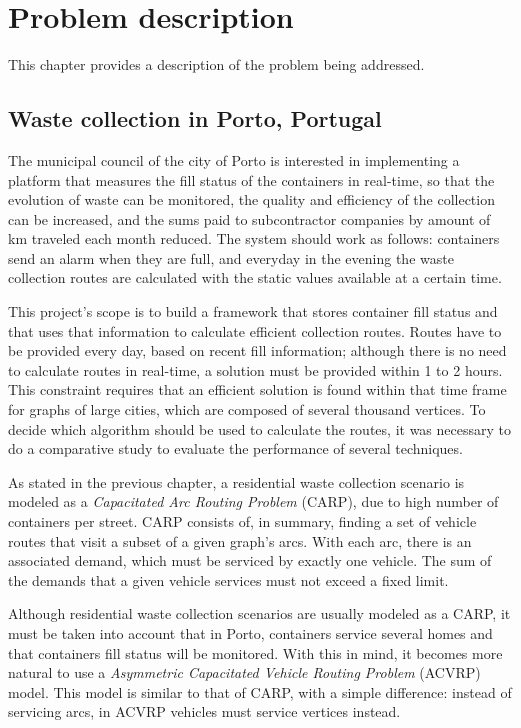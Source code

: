 \chapter{Problem description}
\label{chap:problem}

This chapter provides a description of the problem being addressed.


\section{Waste collection in Porto, Portugal}
\label{section:wcpp}

The municipal council of the city of Porto is interested in implementing a
platform that measures the fill status of the containers in real-time, so that
the evolution of waste can be monitored, the quality and efficiency of the
collection can be increased, and the sums paid to subcontractor companies by
amount of km traveled each month reduced. The system should work as follows:
containers send an alarm when they are full, and everyday in the evening the
waste collection routes are calculated with the static values available at a
certain time.

This project's scope is to build a framework that stores container fill status
and that uses that information to calculate efficient collection routes. Routes
have to be provided every day, based on recent fill information; although there
is no need to calculate routes in real-time, a solution must be provided within
1 to 2 hours. This constraint requires that an efficient solution is found
within that time frame for graphs of large cities, which are composed of
several thousand vertices. To decide which algorithm should be used to
calculate the routes, it was necessary to do a comparative study to evaluate
the performance of several techniques.

As stated in the previous chapter, a residential waste collection scenario is
modeled as a \textit{Capacitated Arc Routing Problem} (CARP), due to high number
of containers per street. CARP consists of, in summary, finding a set of vehicle
routes that visit a subset of a given graph's arcs. With each arc, there is an
associated demand, which must be serviced by exactly one vehicle. The sum of
the demands that a given vehicle services must not exceed a fixed limit.

Although residential waste collection scenarios are usually modeled as a CARP,
it must be taken into account that in Porto, containers service several homes
and that containers fill status will be monitored. With this in mind, it becomes
more natural to use a \textit{Asymmetric Capacitated Vehicle Routing Problem}
(ACVRP) model.  This model is similar to that of CARP, with a simple difference:
instead of servicing arcs, in ACVRP vehicles must service vertices instead.



